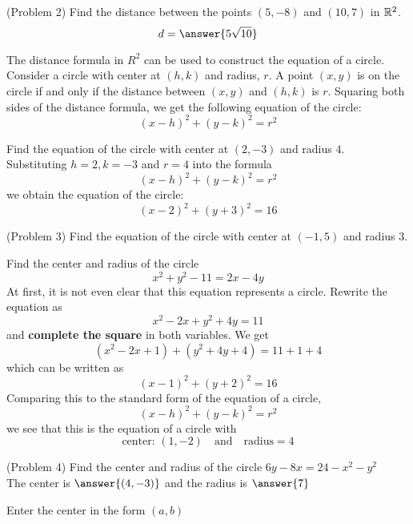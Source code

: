 \documentclass[handout]{ximera}
\begin{document}
\begin{problem}(Problem 2)
Find the distance between the points $(5,-8)$ and $(10,7)$ in $\mathbb R^2$.\\
\[
d = \answer{5\sqrt{10}}
\]
\end{problem}

The distance formula in $R^2$ can be used to construct the equation of a circle. Consider a circle with center at $(h,k)$ and radius, $r$.
A point $(x,y)$ is on the circle if and only if the distance between $(x,y)$ and $(h,k)$ is $r$. 
Squaring both sides of the distance formula, we get the following equation of the circle: 
\[
(x-h)^2 + (y-k)^2 = r^2
\]

\begin{example}[Example 3]
Find the equation of the circle with center at $(2, -3)$ and radius $4$.\\
Substituting $h = 2, k = -3$ and $r =4$ into the formula
\[
(x-h)^2 + (y-k)^2 = r^2
\]
we obtain the equation of the circle:
\[
(x-2)^2 + (y+3)^2 = 16
\]
\end{example}

\begin{problem}(Problem 3)
Find the equation of the circle with center at $(-1, 5)$ and radius $3$.
\begin{multipleChoice}
\end{multipleChoice}
\end{problem}

\begin{example}[Example 4]
Find the center and radius of the circle 
\[
x^2 + y^2 -11 = 2x - 4y
\]
At first, it is not even clear that this equation represents a circle.  Rewrite the equation as
\[
x^2 - 2x + y^2 + 4y = 11
\]
and {\bf complete the square} in both variables. We get
\[
(x^2 - 2x + 1) + (y^2 + 4y + 4) = 11 + 1 + 4
\]
which can be written as 
\[
(x-1)^2 +(y+2)^2 = 16
\]
Comparing this to the standard form of the equation of a circle,
\[
(x-h)^2 + (y-k)^2 = r^2
\]
we see that this is the equation of a circle with 
\[
\text{center: } (1, -2) \quad  \text{and} \quad \text{radius} = 4
\]
\end{example}

\begin{problem}(Problem 4)
Find the center and radius of the circle $6y - 8x= 24 -x^2 - y^2$\\
The center is $\answer{(4, -3)}$ and the radius is $\answer{7}$\\
\begin{hint}
Enter the center in the form $(a,b)$
\end{hint}
\end{problem}
\end{document}
